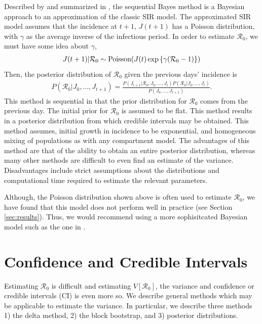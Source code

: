 \documentclass[12pt]{article}
\newcommand{\rr}{\ensuremath{\mathcal{R}_0}}
\begin{document}
Described by \cite{bettencourt2008} and summarized in \cite{obadia2012r0}, the sequential Bayes method is a Bayesian approach to an approximation of the classic SIR model.  The approximated SIR model assumes that the incidence at $t+1$, $J(t+1)$ has a Poisson distribution, with $\gamma$ as the  average inverse of the infectious period. In order to estimate $\rr$, we must have some idea about $\gamma$,
\begin{align*}
J(t+1) | \rr  \sim \textnormal{Poisson}( J(t) \exp \left \{  \gamma (\rr-1)\right \})
\end{align*}
Then, the posterior distribution of $\rr$ given the previous days' incidence is
\begin{align*}
  P(\rr | J_0, \dots, J_{t+1}) = \frac{P(J_{t+1} | \rr, J_0, \dots, J_t)P(\rr| J_0, \dots, J_t)}{P(J_0, \dots, J_{t+1})}.
\end{align*}
This method is sequential in that the prior distribution for $\rr$ comes from the previous day.  The initial prior for $\rr$ is assumed to be flat.  This method results in a posterior distribution from which credible intervals may be obtained.  This method assumes, initial growth in incidence to be exponential, and homogeneous mixing of populations as with any compartment model.  The advantages of this method are that of the ability to obtain an entire posterior distribution, whereas many other methods are difficult to even find an estimate of the variance.  Disadvantages include strict assumptions about the distributions and computational time required to estimate the relevant parameters.

Although, the Poisson distribution shown above is often used to estimate $\rr$, we have found that this model does not perform well in practice (see Section \ref{sec:results}).  Thus, we would recommend using a more sophisitcated Bayesian model such as the one in \cite{bauer2017}.


\section{Confidence and Credible Intervals}
\label{sec:ci}

Estimating $\rr$ is difficult and estimating $V[\rr]$, the variance and confidence or credible intervals (CI) is even more so.  We describe general methods which may be applicable to estimate the variance.  In particular, we describe three methods 1) the delta method, 2) the block bootstrap, and 3) posterior distributions.
\end{document}
